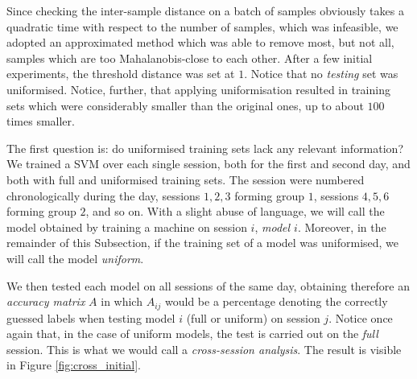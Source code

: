 Since checking the inter-sample distance on a batch of samples
obviously takes a quadratic time with respect to the number of
samples, which was infeasible, we adopted an approximated method which
was able to remove most, but not all, samples which are too Mahalanobis-close to
each other. After a few initial experiments, the threshold distance
was set at $1$. Notice that no \emph{testing} set was uniformised.
Notice, further, that applying uniformisation resulted in training
sets which were considerably smaller than the original ones, up to
about $100$ times smaller.

The first question is: do uniformised training sets lack any relevant
information? We trained a SVM over each single session, both for the
first and second day, and both with full and uniformised training
sets. The session were numbered chronologically during the day,
sessions $1,2,3$ forming group $1$, sessions $4,5,6$ forming group
$2$, and so on. With a slight abuse of language, we will call the
model obtained by training a machine on session $i$, \emph{model
$i$}. Moreover, in the remainder of this Subsection, if the training
set of a model was uniformised, we will call the model \emph{uniform}.

We then tested each model on all sessions of the same day, obtaining
therefore an \emph{accuracy matrix} $A$ in which $A_{ij}$ would be a
percentage denoting the correctly guessed labels when testing model
$i$ (full or uniform) on session $j$. Notice once again that, in the
case of uniform models, the test is carried out on the \emph{full}
session. This is what we would call a \emph{cross-session analysis}.
The result is visible in Figure \ref{fig:cross_initial}.

